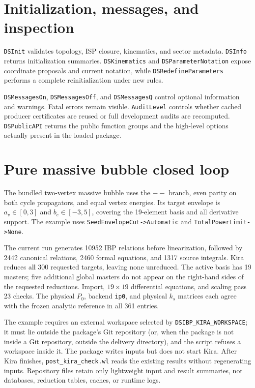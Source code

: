﻿\documentclass[a4paper,11pt]{article}
\begin{document}
\section{Initialization, messages, and inspection}

\texttt{DSInit} validates topology, ISP closure, kinematics, and sector metadata.
\texttt{DSInfo} returns initialization summaries. \texttt{DSKinematics} and
\texttt{DSParameterNotation} expose coordinate proposals and current notation, while
\texttt{DSRedefineParameters} performs a complete reinitialization under new rules.

\texttt{DSMessagesOn}, \texttt{DSMessagesOff}, and \texttt{DSMessagesQ} control optional
information and warnings. Fatal errors remain visible. \texttt{AuditLevel} controls whether
cached producer certificates are reused or full development audits are recomputed.
\texttt{DSPublicAPI} returns the public function groups and the high-level options actually
present in the loaded package.

\section{Pure massive bubble closed loop}

The bundled two-vertex massive bubble uses the $--$ branch, even parity on both cycle
propagators, and equal vertex energies. Its target envelope is $a_v\in[0,3]$ and
$b_e\in[-3,5]$, covering the 19-element basis and all derivative support. The example uses
\texttt{SeedEnvelopeCut->Automatic} and \texttt{TotalPowerLimit->None}.

The current run generates 10952 IBP relations before linearization, followed by 2442 canonical
relations, 2460 formal equations, and 1317 source integrals. Kira reduces all 300 requested
targets, leaving none unreduced. The active basis has 19 masters; five additional global
masters do not appear on the right-hand sides of the requested reductions. Import,
$19\times19$ differential equations, and scaling pass 23 checks. The physical $P_0$,
backend \texttt{ip0}, and physical $k_s$ matrices each agree with the frozen analytic
reference in all 361 entries.

The example requires an external workspace selected by \texttt{DSIBP\_KIRA\_WORKSPACE}; it must lie outside the package's Git repository (or, when the package is not inside a Git repository, outside the delivery directory), and the script refuses a workspace inside it.
The package writes inputs but does not start Kira. After Kira finishes,
\texttt{post\_kira\_check.wl} reads the existing results without regenerating inputs.
Repository files retain only lightweight input and result summaries, not databases,
reduction tables, caches, or runtime logs.
\end{document}
